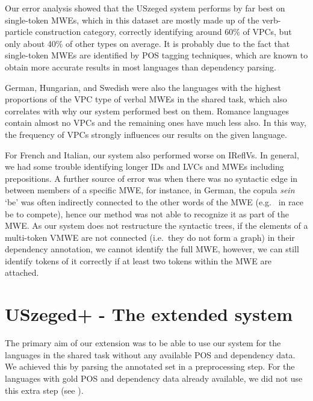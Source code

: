 \documentclass[output=paper,
modfonts,
]{langscibook}
\begin{document}
Our error analysis showed that the USzeged system performs by far best on single-token MWEs, which in this dataset are mostly made up of the verb-particle construction category, correctly identifying around 60\% of VPCs, but only about 40\% of other types on average. It is probably due to the fact that single-token MWEs are identified by POS tagging techniques, which are known to obtain more accurate results in most languages than dependency parsing.

German, Hungarian, and Swedish were also the languages with the highest proportions of the VPC type of verbal MWEs in the shared task, which also correlates with why our system performed best on them. Romance languages contain almost no VPCs and the remaining ones have much less also. In this way, the frequency of VPCs strongly influences our results on the given language.

For French and Italian, our system also performed worse on IReflVs. In general, we had some trouble identifying longer IDs and LVCs and MWEs including prepositions. A further source of error was when there was no syntactic edge in between members of a specific MWE, for instance, in German, the copula \emph{sein} `be’ was often indirectly connected to the other words of the MWE (e.g.~ {in race be} {to compete}), hence our method was not able to recognize it as part of the MWE. As our system does not restructure the syntactic trees, if the elements of a multi-token VMWE are not connected (i.e.~they do not form a graph) in their dependency annotation, we cannot identify the full MWE, however, we can still identify tokens of it correctly if at least two tokens within the MWE are attached.

\section{USzeged+ - The extended system}

The primary aim of our extension was to be able to use our system for the languages in the shared task without any available POS and dependency data. We achieved this by parsing the annotated set in a preprocessing step. For the languages with gold POS and dependency data already available, we did not use this extra step (see ).
\end{document}
